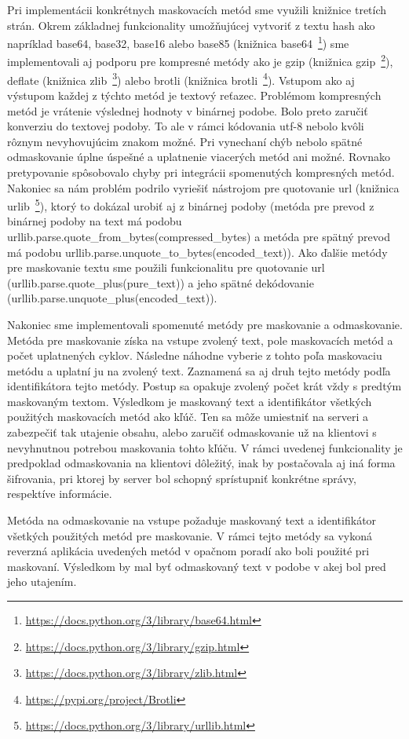 \documentclass[conference, 11pt,slovak,a4paper,twoside]{IEEEtran}
\begin{document}
Pri implementácii konkrétnych maskovacích metód sme využili knižnice tretích strán. Okrem základnej funkcionality umožňujúcej vytvoriť z textu hash ako napríklad base64, base32, base16 alebo base85 (knižnica base64~\footnote{\url{https://docs.python.org/3/library/base64.html}}) sme implementovali aj podporu pre kompresné metódy ako je gzip (knižnica gzip~\footnote{\url{https://docs.python.org/3/library/gzip.html}}), deflate (knižnica zlib~\footnote{\url{https://docs.python.org/3/library/zlib.html}}) alebo brotli (knižnica brotli~\footnote{\url{https://pypi.org/project/Brotli}}). Vstupom ako aj výstupom každej z týchto metód je textový reťazec. Problémom kompresných metód je vrátenie výslednej hodnoty v binárnej podobe. Bolo preto zaručiť konverziu do textovej podoby. To ale v rámci kódovania utf-8 nebolo kvôli rôznym nevyhovujúcim znakom možné. Pri vynechaní chýb nebolo spätné odmaskovanie úplne úspešné a uplatnenie viacerých metód ani možné. Rovnako pretypovanie spôsobovalo chyby pri integrácii spomenutých kompresných metód. Nakoniec sa nám problém podrilo vyriešiť nástrojom pre quotovanie url (knižnica urlib~\footnote{\url{https://docs.python.org/3/library/urllib.html}}), ktorý to dokázal urobiť aj z binárnej podoby (metóda pre prevod z binárnej podoby na text má podobu urllib.parse.quote\_from\_bytes(compressed\_bytes) a metóda pre spätný prevod má podobu urllib.parse.unquote\_to\_bytes(encoded\_text)). Ako ďalšie metódy pre maskovanie textu sme použili funkcionalitu pre quotovanie url (urllib.parse.quote\_plus(pure\_text)) a jeho spätné dekódovanie (urllib.parse.unquote\_plus(encoded\_text)).

Nakoniec sme implementovali spomenuté metódy pre maskovanie a odmaskovanie. Metóda pre maskovanie získa na vstupe zvolený text, pole maskovacích metód a počet uplatnených cyklov. Následne náhodne vyberie z tohto poľa maskovaciu metódu a uplatní ju na zvolený text. Zaznamená sa aj druh tejto metódy podľa identifikátora tejto metódy. Postup sa opakuje zvolený počet krát vždy s predtým maskovaným textom. Výsledkom je maskovaný text a identifikátor všetkých použitých maskovacích metód ako kľúč. Ten sa môže umiestniť na serveri a zabezpečiť tak utajenie obsahu, alebo zaručiť odmaskovanie už na klientovi s nevyhnutnou potrebou maskovania tohto kľúču. V rámci uvedenej funkcionality je predpoklad odmaskovania na klientovi dôležitý, inak by postačovala aj iná forma šifrovania, pri ktorej by server bol schopný sprístupniť konkrétne správy, respektíve informácie.

Metóda na odmaskovanie na vstupe požaduje maskovaný text a identifikátor všetkých použitých metód pre maskovanie. V rámci tejto metódy sa vykoná reverzná aplikácia uvedených metód v opačnom poradí ako boli použité pri maskovaní. Výsledkom by mal byť odmaskovaný text v podobe v akej bol pred jeho utajením.
\end{document}
